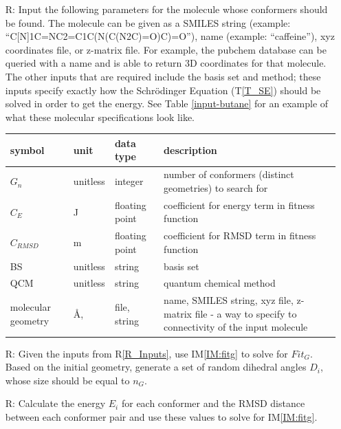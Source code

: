 \documentclass[12pt]{article}
\newcommand{\tref}[1]{T\ref{#1}}
\newcommand{\iref}[1]{IM\ref{#1}}
\newcounter{reqnum} %
\newcommand{\rref}[1]{R\ref{#1}}
\begin{document}
\noindent \begin{itemize}

\item[R\refstepcounter{reqnum}\thereqnum \label{R_Inputs}:] Input the following 
parameters for the molecule whose conformers should be found. The molecule can 
be given as a SMILES string (example: ``C[N]1C=NC2=C1C(N(C(N2C)=O)C)=O''), name 
(example: ``caffeine''), xyz coordinates file, or z-matrix file. For example, 
the pubchem database can be queried with a name and is able to return 3D 
coordinates for that molecule. The other inputs that are required include the 
basis set and method; these inputs specify exactly how the Schr\"{o}dinger 
Equation (\tref{T_SE}) should be solved in order to get the energy. See Table 
\ref{input-butane} for an example of what these molecular specifications look 
like. 

\begin{tabularx}{\textwidth}{p{1.7cm}p{2cm}p{2cm}X}
	\toprule
	symbol & unit & data type & description \\
	\midrule
	$G_n$ & unitless & integer & number of conformers (distinct geometries) 
	to search for \\
	$C_E$ & \si{\joule} & floating point & coefficient for energy term in 
	fitness function \\
	$C_{RMSD}$ & \si{\metre} & floating point & coefficient for RMSD term 
	in fitness function \\
	BS & unitless & string & basis set \\
	QCM & unitless & string & quantum chemical method \\
	molecular geometry & \si{\angstrom}, \textdegree & file, string & name, 
	SMILES 
	string, xyz file, z-matrix file - a way to specify to connectivity of 
	the input molecule \\
	\bottomrule
\end{tabularx}

\item[R\refstepcounter{reqnum}\thereqnum \label{R_OutputInputs}:] Given the 
inputs from \rref{R_Inputs}, use \iref{IM:fitg} to solve for $Fit_G$. Based on 
the initial geometry, generate a set of random dihedral angles $D_i$, whose 
size should be equal to $n_G$.

\item[R\refstepcounter{reqnum}\thereqnum \label{R_Calculate}:] Calculate the 
energy $E_i$ for each conformer and the RMSD distance between each conformer 
pair and use these values to solve for \iref{IM:fitg}. 


\end{itemize}
\end{document}

